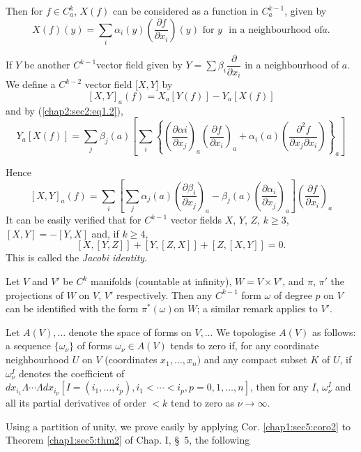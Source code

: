 Then for $f \in  C^k_a$, $X(f)$ can be considered as a function in
$C^{k-1}_a$, given by  
\begin{equation}
  X(f)(y) = \sum_i \alpha_i (y) \left(\frac{\partial f}{\partial
    x_i}\right) (
  y) \text { for } y \text{~ in a neighbourhood of}
  a. \tag{1.2}\label{chap2:sec2:eq1.2}  
\end{equation}   
      
If $Y$ be another $C^{k-1}$vector field given by $Y= \sum \beta_i 
\dfrac{\partial}{\partial x_i}$ in a neighbourhood of $a$. We define a
$C^{k-2}$ vector field [$X, Y$] by  
$$
[X, Y]_a (f) = X_a [Y(f)]- Y_a[X(f)]
$$  
and by (\ref{chap2:sec2:eq1.2}),
$$
Y_a [X(f)]= \sum_j \beta_j (a)  \left[ \sum_i \left\{ \left( \frac{\partial
    \alpha i}{\partial x_j}\right)_a \left(\frac{\partial f}{\partial
    x_i}\right )_a +
  \alpha _i (a) \left(\frac{\partial^2 f}{\partial x_j \partial x_i}\right)
  \right\}_a \right] 
$$
   
Hence\pageoriginale  
$$
[X,Y]_a (f) = \sum_i \left[ \sum_j \alpha_j (a) \left(\frac{\partial
    \beta_i}{\partial x_j}\right)_a - \beta_j (a) \left( \frac{\partial
    \alpha_i}{\partial x_j}\right)_a \right] \left( \frac{\partial f}{\partial
  x_i}\right)_a 
$$
It can be easily verified that for $C^{k-1}$ vector fields $X$, $Y$,
$Z$, $k \ge 3$, $[X, Y] =- [Y, X]$ and, if $k \ge 4$, 
$$
[X,  [Y,Z]] +  [Y, [Z,X]] +  [Z, [X, Y]] = 0.
$$
This is called the \textit{Jacobi identity}.
   

   
Let $V$ and $V'$ be $C^k$ manifolds (countable at infinity), $W = V
\times V'$, and $\pi$, $\pi'$ the projections of $W$ on $V$, $V'$
respectively. Then any $C^{k-1}$ form $\omega$ of degree $p$ on $V$
can be identified with the form $\pi^* (\omega)$on $W$; a similar
remark applies to $V'$.  

Let $A(V),\ldots$ denote the space of forms on $V, \ldots$ We
topologise $A(V)$ as follows: a sequence $\{ \omega_\nu\}$ of forms
$\omega_\nu \in A (V)$ tends to zero if, for any coordinate
neighbourhood $U$ on $V$ (coordinates $x_1,  \ldots , x_n)$ and any
compact subset $K$ of $U$, if $\omega^I_\nu$ denotes the coefficient
of $dx_{i_1} \Lambda \cdots \Lambda dx_{i_p} [I= (i_1, \ldots , i_p),
  i_1 < \cdots  < i_p, p =0, 1, \ldots  , n]$, then for any $I$,
$\omega^I_\nu$ and all its partial derivatives of order $< k$ tend to
zero  as $\nu \to \infty$. 

Using a partition of unity, we prove easily by applying
Cor. \ref{chap1:sec5:coro2} to
Theorem \ref{chap1:sec5:thm2} of Chap. I, \S\ 5, the following 
   

